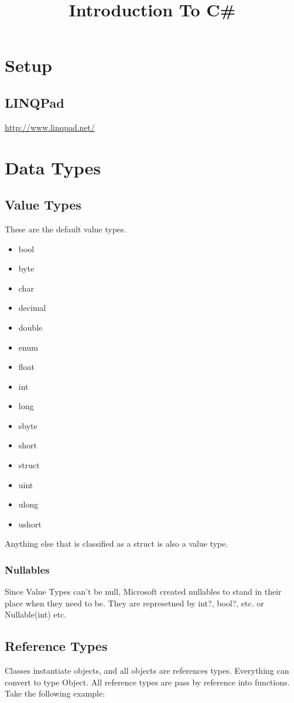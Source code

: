 \documentclass {amsart}
\title{Introduction To C\#}
\begin{document}
\maketitle


\section{Setup}
	\subsection{LINQPad}
		\url{http://www.linqpad.net/}

\section{Data Types}
	\subsection{Value Types}  These are the default value types. 
		\begin{itemize}
			\item bool
			\item byte
			\item char
			\item decimal
			\item double
			\item enum
			\item float
			\item int
			\item long
			\item sbyte
			\item short
			\item struct
			\item uint
			\item ulong
			\item ushort
		\end{itemize}

		Anything else that is classified as a struct is also a value type. 

		\subsubsection{Nullables} Since Value Types can't be null, Microsoft created nullables to stand in their place when they need to be.  They are represetned by int?, bool?, etc. or Nullable(int) etc.  
	\subsection{Reference Types}  Classes instantiate objects, and all objects are references types.  Everything can convert to type Object.  All reference types are pass by reference into functions.  Take the following example: 
\end{document}
